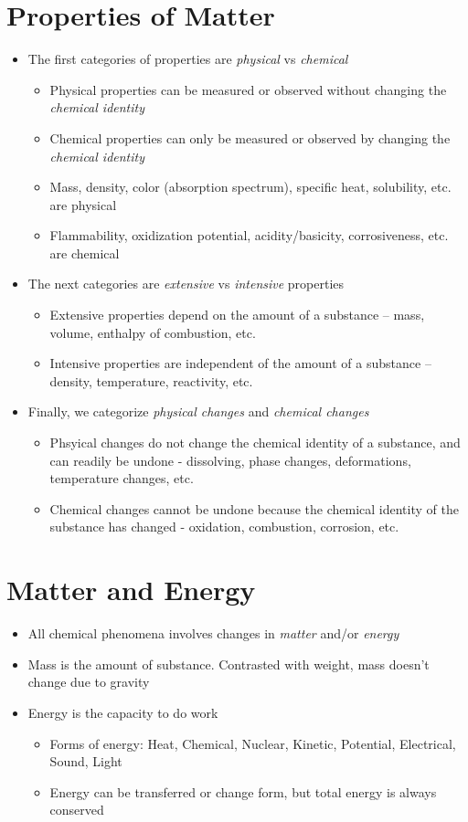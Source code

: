 \documentclass[12pt, openany, letterpaper]{memoir}
\begin{document}
\section{Properties of Matter}
\begin{itemize}
	\item The first categories of properties are \emph{physical} vs \emph{chemical}
	\begin{itemize}
		\item Physical properties can be measured or observed without changing the \emph{chemical identity}
		\item Chemical properties can only be measured or observed by changing the \emph{chemical identity}
		\item Mass, density, color (absorption spectrum), specific heat, solubility, etc. are physical
		\item Flammability, oxidization potential, acidity/basicity, corrosiveness, etc. are chemical
	\end{itemize}
	\item The next categories are \emph{extensive} vs \emph{intensive} properties
	\begin{itemize}
		\item Extensive properties depend on the amount of a substance -- mass, volume, enthalpy of combustion, etc.
		\item Intensive properties are independent of the amount of a substance -- density, temperature, reactivity, etc.
	\end{itemize}
	\item Finally, we categorize \emph{physical changes} and \emph{chemical changes}
	\begin{itemize}
		\item Phsyical changes do not change the chemical identity of a substance, and can readily be undone - dissolving, phase changes, deformations, temperature changes, etc.
		\item Chemical changes cannot be undone because the chemical identity of the substance has changed - oxidation, combustion, corrosion, etc.
	\end{itemize}
\end{itemize}
\section{Matter and Energy}
\begin{itemize}
	\item All chemical phenomena involves changes in \emph{matter} and/or \emph{energy}
	\item Mass is the amount of substance. Contrasted with weight, mass doesn't change due to gravity
	\item Energy is the capacity to do work
	\begin{itemize}
		\item Forms of energy: Heat, Chemical, Nuclear, Kinetic, Potential, Electrical, Sound, Light
		\item Energy can be transferred or change form, but total energy is always conserved
	\end{itemize}
\end{itemize}
\end{document}
